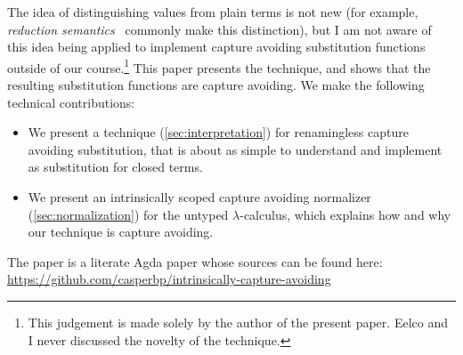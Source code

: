 The idea of distinguishing values from plain terms is not new (for example, \emph{reduction semantics}~\cite{FelleisenH92} commonly make this distinction), but I am not aware of this idea being applied to implement capture avoiding substitution functions outside of our course.\footnote{This judgement is made solely by the author of the present paper. Eelco and I never discussed the novelty of the technique.}
This paper presents the technique, and shows that the resulting substitution functions are capture avoiding.
We make the following technical contributions:
%
\begin{itemize}
\item We present a technique (\cref{sec:interpretation}) for renamingless capture avoiding substitution, that is about as simple to understand and implement as substitution for closed terms.
\item We present an intrinsically scoped capture avoiding normalizer (\cref{sec:normalization}) for the untyped $\lambda$-calculus, which explains how and why our technique is capture avoiding.
\end{itemize}
%
The paper is a literate Agda paper whose sources can be found here: \url{https://github.com/casperbp/intrinsically-capture-avoiding}


